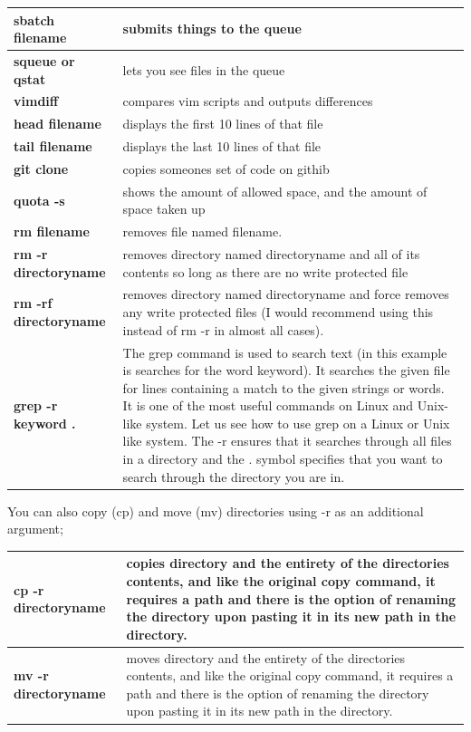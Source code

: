 \documentclass{article}
\begin{document}
\begin{center}
\begin{tabular*}{\textwidth}{ | p{} | p{}| }
\hline
\textbf{sbatch filename} & submits things to the queue \\
\hline 
\textbf{squeue or qstat} & lets you see files in the queue \\
\hline 
\textbf{vimdiff} & compares vim scripts and outputs differences \\
\hline 
\textbf{head filename} & displays the first 10 lines of that file \\ 
\hline 
\textbf{tail filename} & displays the last 10 lines of that file \\ 
\hline 
\textbf{git clone} & copies someones set of code on githib \\ 
\hline 
\textbf{quota -s} & shows the amount of allowed space, and the amount of space taken up \\ 
\hline
\textbf{rm filename} & removes file named filename. \\ 
\hline
\textbf{rm -r directoryname} & removes directory named directoryname and all of its contents so long as there are no write protected file \\ 
\hline
\textbf{rm -rf directoryname} & removes directory named directoryname and force removes any write protected files (I would recommend using this instead of rm -r in almost all cases). \\ 
\hline 
\textbf{grep -r keyword .} & The grep command is used to search text (in this example is searches for the word keyword). It searches the given file for lines containing a match to the given strings or words. It is one of the most useful commands on Linux and Unix-like system. Let us see how to use grep on a Linux or Unix like system. The -r ensures that it searches through all files in a directory and the . symbol specifies that you want to search through the directory you are in. \\ 
\hline 
\end{tabular*}
\end{center}

You can also copy (cp) and move (mv) directories using -r as an additional argument;

\begin{center}
\begin{tabular*}{\textwidth}{ | p{} | p{}| }
\hline
\textbf{cp -r directoryname} & copies directory and the entirety of the directories contents, and like the original copy command, it requires a path and there is the option of renaming the directory upon pasting it in its new path in the directory. \\
\hline 
\textbf{mv -r directoryname} & moves directory and the entirety of the directories contents, and like the original copy command, it requires a path and there is the option of renaming the directory upon pasting it in its new path in the directory. \\
\hline 
\end{tabular*}
\end{center}
\end{document}
